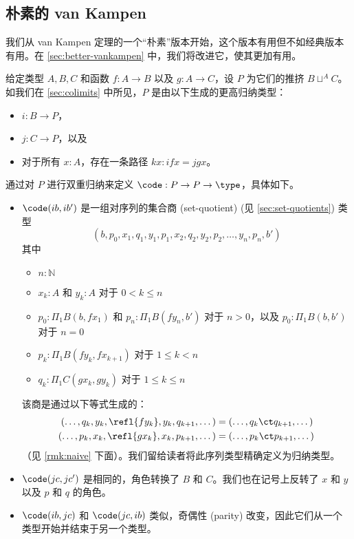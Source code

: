 {\subsection{朴素的 van Kampen}
\label{sec:naive-vankampen}

我们从 van Kampen 定理的一个“朴素”版本开始，这个版本有用但不如经典版本有用。在 \cref{sec:better-vankampen} 中，我们将改进它，使其更加有用。

%

给定类型 $A,B,C$ 和函数 $f:A\to B$ 以及 $g:A\to C$，设 $P$ 为它们的推挤 $B\sqcup^A C$。如我们在 \cref{sec:colimits} 中所见，$P$ 是由以下生成的更高归纳类型：
\begin{itemize}
  \item $i:B\to P$，
  \item $j:C\to P$，以及
  \item 对于所有 $x:A$，存在一条路径 $k x:ifx = jgx$。
\end{itemize}
通过对 $P$ 进行双重归纳来定义 $\code:P\to P\to \type$，具体如下。
\begin{itemize}
  \item $\code(ib,ib')$ 是一组对序列的集合商 (set-quotient) (见 \cref{sec:set-quotients}) 类型
  \[ (b, p_0, x_1, q_1, y_1, p_1, x_2, q_2, y_2, p_2, \dots, y_n, p_n, b') \]
  其中
  \begin{itemize}
    \item $n:\mathbb{N}$
    \item $x_k:A$ 和 $y_k:A$ 对于 $0<k \le n$
    \item $p_0:\Pi_1B(b,f x_1)$ 和 $p_n:\Pi_1B(f y_n, b')$ 对于 $n>0$，以及 $p_0:\Pi_1B(b,b')$ 对于 $n=0$
    \item $p_k:\Pi_1B(f y_k, fx_{k+1})$ 对于 $1\le k < n$
    \item $q_k:\Pi_1C(gx_k, gy_k)$ 对于 $1\le k\le n$
  \end{itemize}
  该商是通过以下等式生成的：
  \begin{align*}
  (\dots, q_k, y_k, \refl{fy_k}, y_k, q_{k+1},\dots)
    &= (\dots, q_k\ct q_{k+1},\dots)\\
    (\dots, p_k, x_k, \refl{gx_k}, x_k, p_{k+1},\dots)
    &= (\dots, p_k\ct p_{k+1},\dots)
  \end{align*}
  （见 \cref{rmk:naive} 下面）。我们留给读者将此序列类型精确定义为归纳类型。
  \item $\code(jc,jc')$ 是相同的，角色转换了 $B$ 和 $C$。我们也在记号上反转了 $x$ 和 $y$ 以及 $p$ 和 $q$ 的角色。
  \item $\code(ib,jc)$ 和 $\code(jc,ib)$ 类似，奇偶性 (parity) 改变，因此它们从一个类型开始并结束于另一个类型。

\end{itemize}}
